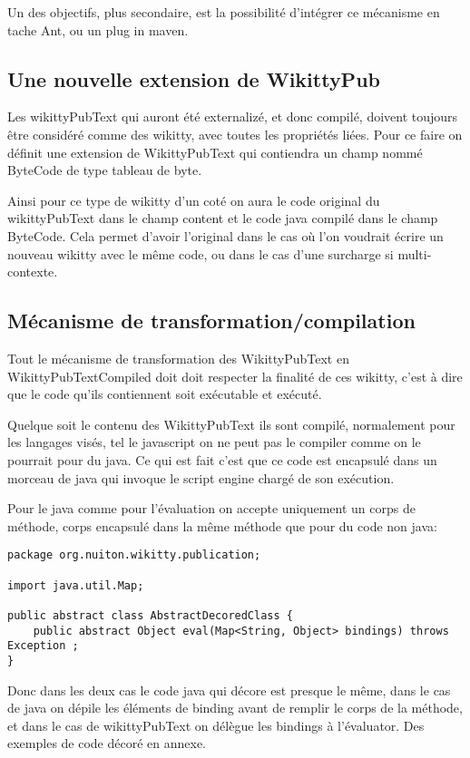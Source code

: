 Un des objectifs, plus secondaire, est la possibilité d'intégrer ce mécanisme
en tache Ant, ou un plug in maven.

\subsection{Une nouvelle extension de WikittyPub}

Les wikittyPubText qui auront été externalizé, et donc compilé, doivent toujours 
être considéré comme des wikitty, avec toutes les propriétés liées. Pour ce 
faire on définit une extension de WikittyPubText qui contiendra un champ nommé 
ByteCode de type tableau de byte.

Ainsi pour ce type de wikitty d'un coté on aura le code original du 
wikittyPubText dans le champ content et le code java compilé dans le champ
ByteCode. Cela permet d'avoir l'original dans le cas où l'on voudrait écrire
un nouveau wikitty avec le même code, ou dans le cas d'une surcharge si 
multi-contexte.

\subsection{Mécanisme de transformation/compilation}

Tout le mécanisme de transformation des WikittyPubText en WikittyPubTextCompiled
doit doit respecter la finalité de ces wikitty, c'est à dire que le code qu'ils
contiennent soit exécutable et exécuté. 

Quelque soit le contenu des WikittyPubText ils sont compilé, normalement pour les
langages visés, tel le javascript on ne peut pas le compiler comme on le pourrait 
pour du java. Ce qui est fait c'est que ce code est encapsulé dans un morceau
de java qui invoque le script engine chargé de son exécution. 

Pour le java comme pour l'évaluation on accepte uniquement un corps de méthode,
corps encapsulé dans la même méthode que pour du code non java:


\begin{lstlisting}
package org.nuiton.wikitty.publication;

import java.util.Map;

public abstract class AbstractDecoredClass {
    public abstract Object eval(Map<String, Object> bindings) throws Exception ;
}
\end{lstlisting}

Donc dans les deux cas le code java qui décore est presque le même, dans le 
cas de java on dépile les éléments de binding avant de remplir le corps de la 
méthode, et dans le cas de wikittyPubText on délègue les bindings à l'évaluator.
Des exemples de code décoré en annexe.

